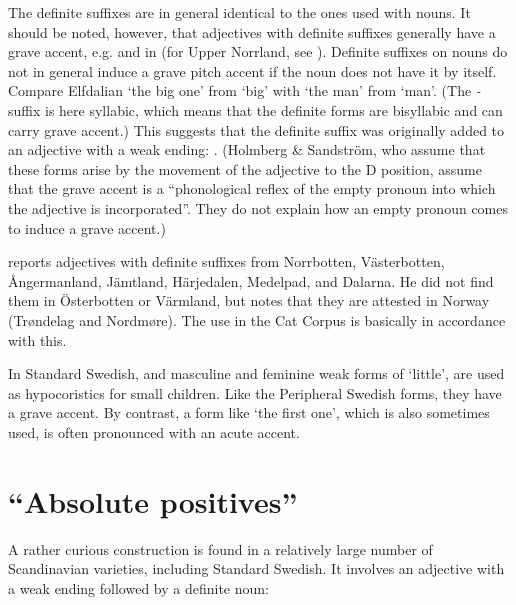 The definite suffixes are in general identical to the ones used with nouns. It should be noted, however, that adjectives with definite suffixes generally have a grave accent, e.g.  and  in  (for Upper Norrland, see \citet{HolmbergEtAl2003}). Definite suffixes on nouns do not in general induce a grave pitch accent if the noun does not have it by itself. Compare Elfdalian  ‘the big one’ from  ‘big’ with  ‘the man’ from  ‘man’. (The\textit{ {}-} suffix is here syllabic, which means that the definite forms are bisyllabic and can carry grave accent.) This suggests that the definite suffix was originally added to an adjective with a weak ending: . (Holmberg \& Sandström, who assume that these forms arise by the movement of the adjective to the D position, assume that the grave accent is a “phonological reflex of the empty pronoun into which the adjective is incorporated”. They do not explain how an empty pronoun comes to induce a grave accent.) 

\citet[51]{Delsing2003a} reports adjectives with definite suffixes from Norrbotten, Västerbotten, Ångermanland, Jämtland, Härjedalen, Medelpad, and Dalarna. He did not find them in Österbotten or Värmland, but notes that they are attested in Norway (Trøndelag and Nordmøre). The use in the Cat Corpus is basically in accordance with this. 

In Standard Swedish,  and  masculine and feminine weak forms of  ‘little’, are used as hypocoristics for small children. Like the Peripheral Swedish forms, they have a grave accent. By contrast, a form like  ‘the first one’, which is also sometimes used, is often pronounced with an acute accent. 

\section{“Absolute positives”}
\label{sec:4.8}

A rather curious construction is found in a relatively large number of Scandinavian varieties, including Standard Swedish. It involves an adjective with a weak ending followed by a definite noun:

